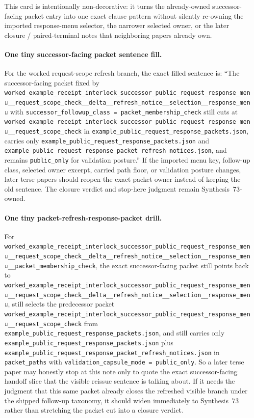 \documentclass[11pt]{article}
\begin{document}
This card is intentionally non-decorative: it turns the already-owned successor-facing packet entry into one exact clause pattern without silently re-owning the imported response-menu selector, the narrower selected owner, or the later closure / paired-terminal notes that neighboring papers already own.\cite{series:workedexample}

\paragraph{One tiny successor-facing packet sentence fill.}
For the worked request-scope refresh branch, the exact filled sentence is: ``The successor-facing packet fixed by \nolinkurl{worked_example_receipt_interlock_successor_public_request_response_menu__request_scope_check__delta__refresh_notice__selection__response_menu} with \nolinkurl{successor_followup_class = packet_membership_check} still cuts at \nolinkurl{worked_example_receipt_interlock_successor_public_request_response_menu__request_scope_check} in \nolinkurl{example_public_request_response_packets.json}, carries only \nolinkurl{example_public_request_response_packets.json} and \nolinkurl{example_public_request_response_packet_refresh_notices.json}, and remains \nolinkurl{public_only} for validation posture.'' If the imported menu key, follow-up class, selected owner excerpt, carried path floor, or validation posture changes, later terse papers should reopen the exact packet owner instead of keeping the old sentence. The closure verdict and stop-here judgment remain Synthesis~73-owned.\cite{series:workedexample}

\paragraph{One tiny packet-refresh-response-packet drill.}
For \nolinkurl{worked_example_receipt_interlock_successor_public_request_response_menu__request_scope_check__delta__refresh_notice__selection__response_menu__packet_membership_check}, the exact successor-facing packet still points back to \nolinkurl{worked_example_receipt_interlock_successor_public_request_response_menu__request_scope_check__delta__refresh_notice__selection__response_menu}, still selects the predecessor packet \nolinkurl{worked_example_receipt_interlock_successor_public_request_response_menu__request_scope_check} from \nolinkurl{example_public_request_response_packets.json}, and still carries only \nolinkurl{example_public_request_response_packets.json} plus \nolinkurl{example_public_request_response_packet_refresh_notices.json} in \nolinkurl{packet_paths} with \nolinkurl{validation_capsule_mode = public_only}. So a later terse paper may honestly stop at this note only to quote the exact successor-facing handoff slice that the visible reissue sentence is talking about. If it needs the judgment that this same packet already closes the refreshed visible branch under the shipped follow-up taxonomy, it should widen immediately to Synthesis~73 rather than stretching the packet cut into a closure verdict.\cite{series:workedexample}
\end{document}

